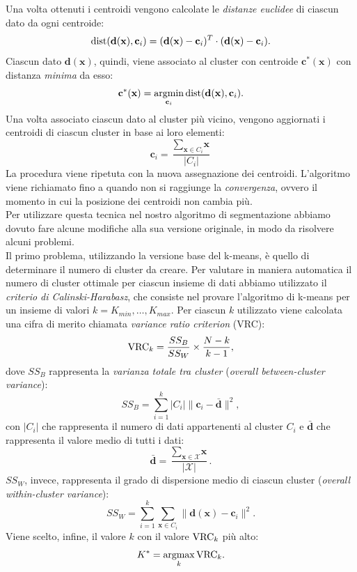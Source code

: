 Una volta ottenuti i centroidi vengono calcolate le \textit{distanze euclidee} di ciascun dato da ogni centroide:
\[\operatorname*{dist}(\textbf{d}(\textbf{x}),\textbf{c}_i)=(\textbf{d}(\textbf{x})- \textbf{c}_i)^T \cdot (\textbf{d}(\textbf{x})- \textbf{c}_i). \]
Ciascun dato $\textbf{d}(\textbf{x})$, quindi, viene associato al cluster con centroide $\textbf{c}^*(\textbf{x})$ con distanza \textit{minima} da esso:
\[\textbf{c}^*(\textbf{x}) = \operatorname*{argmin}_{\textbf{c}_i} \operatorname*{dist}(\textbf{d}(\textbf{x}),\textbf{c}_i). \]
Una volta associato ciascun dato al cluster pi\`u vicino, vengono aggiornati i centroidi di ciascun cluster in base ai loro elementi:
\[ \textbf{c}_i = \frac{\sum_{\textbf{x}\in C_i}\textbf{x}}{|C_i|} \] 
La procedura viene ripetuta con la nuova assegnazione dei centroidi.
L'algoritmo viene richiamato fino a quando non si raggiunge la \textit{convergenza}, ovvero il momento in cui la posizione dei centroidi non cambia pi\`u.\\
Per utilizzare questa tecnica nel nostro algoritmo di segmentazione abbiamo dovuto fare alcune modifiche alla sua versione originale, in modo da risolvere alcuni problemi.\\
Il primo problema, utilizzando la versione base del k-means, \`e quello di determinare il numero di cluster da creare.
Per valutare in maniera automatica il numero di cluster ottimale per ciascun insieme di dati  abbiamo utilizzato il \textit{criterio di Calinski-Harabasz}\cite{calinski1974dendrite}, che consiste nel provare l'algoritmo di k-means per un insieme di valori $k=K_{min},\dots,K_{max}$.
Per ciascun $k$ utilizzato viene calcolata una cifra di merito chiamata \textit{variance ratio criterion} (VRC):
\[{\operatorname*{VRC}}_{k} = \frac{SS_B}{SS_W}\times\frac{N-k}{k-1},\]
dove $SS_B$ rappresenta la \textit{varianza totale tra cluster} (\textit{overall between-cluster variance}):
\[SS_B=\sum_{i=1}^{k}|C_i|\|\textbf{c}_i - \bar{\textbf{d}}\|^2, \]
con $|C_i|$ che rappresenta il numero di dati appartenenti al cluster $C_i$ e $\bar{\textbf{d}}$ che rappresenta il valore medio di tutti  i dati:
\[\bar{\textbf{d}}=\frac{\sum_{\textbf{x}\in \mathcal{X}}\textbf{x}}{|\mathcal{X}|}.\] 
$SS_W$, invece, rappresenta il grado di dispersione medio di ciascun cluster (\textit{overall within-cluster variance}):
\[SS_W = \sum_{i=1}^{k}\sum_{\textbf{x} \in C_i}\|\textbf{d}(\textbf{x})-\textbf{c}_i\|^2.\]
Viene scelto, infine, il valore $k$ con il valore ${\operatorname*{VRC}}_k$ pi\`u alto:
\[K^* = \operatorname*{argmax}_k {\operatorname*{VRC}}_k.\]
